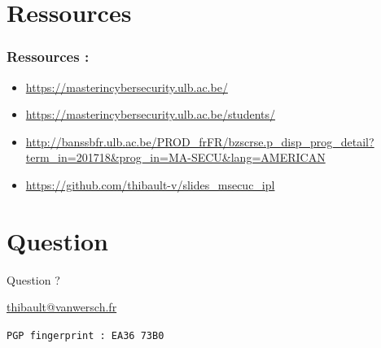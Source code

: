 \documentclass{beamer}
\begin{document}
\section{Ressources}
\begin{frame}[c]
    \frametitle{Ressources :}
    \begin{itemize}
        \item \url{https://masterincybersecurity.ulb.ac.be/}
        \item \url{https://masterincybersecurity.ulb.ac.be/students/}
        \item \url{http://banssbfr.ulb.ac.be/PROD\_frFR/bzscrse.p\_disp\_prog\_detail?term\_in=201718\&prog\_in=MA-SECU\&lang=AMERICAN}
        \item \url{https://github.com/thibault-v/slides\_msecuc\_ipl}
    \end{itemize}
\end{frame}

\section{Question}

\begin{frame}
    \centerline{\Huge{Question ?}}
    \vspace*{30px}
    \centerline{\href{mailto:thibault@vanwersch.fr}{thibault@vanwersch.fr}}
    \vspace*{10px}
    \centerline{\tt PGP fingerprint : EA36 73B0}
\end{frame}
\end{document}
